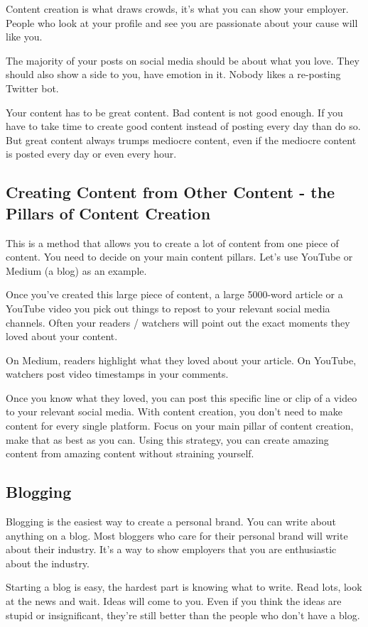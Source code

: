 \documentclass{article}
\begin{document}
Content creation is what draws crowds, it's what you can show your
employer. People who look at your profile and see you are passionate
about your cause will like you.

The majority of your posts on social media should be about what you
love. They should also show a side to you, have emotion in it. Nobody
likes a re-posting Twitter bot.

Your content has to be great content. Bad content is not good enough. If
you have to take time to create good content instead of posting every
day than do so. But great content always trumps mediocre content, even
if the mediocre content is posted every day or even every hour.

\subsection{Creating Content from Other Content - the Pillars of Content Creation}
This is a method that allows you to create a lot of content from one
piece of content. You need to decide on your main content pillars. Let's
use YouTube or Medium (a blog) as an example.

Once you've created this large piece of content, a large 5000-word
article or a YouTube video you pick out things to repost to your
relevant social media channels. Often your readers / watchers will point
out the exact moments they loved about your content.

On Medium, readers highlight what they loved about your article. On
YouTube, watchers post video timestamps in your comments.

Once you know what they loved, you can post this specific line or clip
of a video to your relevant social media. With content creation, you
don't need to make content for every single platform. Focus on your main
pillar of content creation, make that as best as you can. Using this
strategy, you can create amazing content from amazing content without
straining yourself.

\subsection{Blogging}
Blogging is the easiest way to create a personal brand. You can write
about anything on a blog. Most bloggers who care for their personal
brand will write about their industry. It's a way to show employers that
you are enthusiastic about the industry.

Starting a blog is easy, the hardest part is knowing what to write. Read
lots, look at the news and wait. Ideas will come to you. Even if you
think the ideas are stupid or insignificant, they're still better than
the people who don't have a blog.
\end{document}
